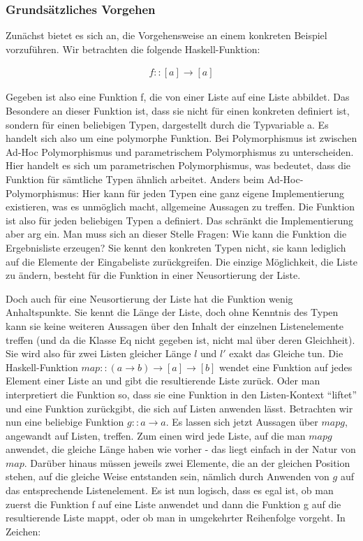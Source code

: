 \documentclass[11pt]{article} %
\begin{document}
\subsubsection{Grundsätzliches Vorgehen}

Zunächst bietet es sich an, die Vorgehensweise an einem konkreten Beispiel vorzuführen. Wir betrachten die folgende Haskell-Funktion:

\begin{align}
f :: [a] \rightarrow [a]
\end{align}

Gegeben ist also eine Funktion f, die von einer Liste auf eine Liste abbildet. Das Besondere an dieser Funktion ist, dass sie
nicht für einen konkreten definiert ist, sondern für einen beliebigen Typen, dargestellt durch die Typvariable a. Es handelt sich
also um eine polymorphe Funktion.
Bei Polymorphismus ist zwischen Ad-Hoc Polymorphismus und parametrischem Polymorphismus zu unterscheiden. Hier handelt es sich um parametrischen Polymorphismus, was bedeutet, dass die Funktion für sämtliche Typen ähnlich arbeitet. Anders beim Ad-Hoc-Polymorphismus: Hier kann für jeden Typen eine ganz eigene Implementierung existieren, was es unmöglich macht, allgemeine
Aussagen zu treffen.
Die Funktion ist also für jeden beliebigen Typen a definiert. Das schränkt die Implementierung aber arg ein. Man muss sich an dieser Stelle Fragen: Wie kann die Funktion die Ergebnisliste erzeugen? Sie kennt den konkreten Typen nicht, sie kann lediglich auf die Elemente der Eingabeliste zurückgreifen. Die einzige Möglichkeit, die Liste zu ändern, besteht für die Funktion in einer Neusortierung der Liste.

Doch auch für eine Neusortierung der Liste hat die Funktion wenig Anhaltspunkte. Sie kennt die Länge der Liste, doch ohne Kenntnis des Typen kann sie keine weiteren Aussagen über den Inhalt der einzelnen Listenelemente treffen (und da die Klasse Eq nicht
gegeben ist, nicht mal über deren Gleichheit). Sie wird also für zwei Listen gleicher Länge $l$ und $l'$ exakt das Gleiche tun.
Die Haskell-Funktion \texttt{$map :: (a \rightarrow b) \rightarrow [a] \rightarrow [b]$} wendet eine Funktion auf jedes Element einer Liste an und gibt die resultierende Liste zurück. Oder man interpretiert die Funktion so, dass sie eine Funktion in den Listen-Kontext ``liftet'' und
eine Funktion zurückgibt, die sich auf Listen anwenden lässt. Betrachten wir nun eine beliebige Funktion $g :: a \rightarrow a$. Es lassen sich jetzt Aussagen über $map g$, angewandt auf Listen, treffen. Zum einen wird jede Liste, auf die man $map g$ anwendet, die gleiche Länge haben wie vorher - das liegt einfach in der Natur von $map$.
Darüber hinaus müssen jeweils zwei Elemente, die an der gleichen Position stehen, auf die gleiche Weise entstanden sein, nämlich
durch Anwenden von $g$ auf das entsprechende Listenelement.
Es ist nun logisch, dass es egal ist, ob man zuerst die Funktion f auf eine Liste anwendet und dann die Funktion g auf die
resultierende Liste mappt, oder ob man in umgekehrter Reihenfolge vorgeht. In Zeichen:
\end{document}
